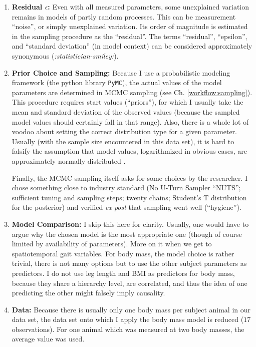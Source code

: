 \begin{enumerate}
\item \textbf{Residual \(\epsilon\):}
\label{sec:orgbf53734}
Even with all measured parameters, some unexplained variation remains in models of partly random processes.
This can be measurement ``noise'', or simply unexplained variation.
Its order of magnitude is estimated in the sampling procedure as the ``residual''.
The terms ``residual'', ``epsilon'', and ``standard deviation'' (in model context) can be considered approximately synonymous (\emph{:statistician-smiley:}).

\item \textbf{Prior Choice and Sampling:}
\label{sec:orgf31f4ce}
Because I use a probabilistic modeling framework (the python library \texttt{PyMC}), the actual values of the model parameters are determined in MCMC sampling (see Ch. \ref{workflow:sampling}).
This procedure requires start values (``priors''), for which I usually take the mean and standard deviation of the observed values (because the sampled model values should certainly fall in that range).
Also, there is a whole lot of voodoo about setting the correct distribution type for a given parameter.
Usually (with the sample size encountered in this data set), it is hard to falsify the assumption that model values, logarithmized in obvious cases, are approximately normally distributed \citep{Downey2013}.

Finally, the MCMC sampling itself asks for some choices by the researcher.
I chose something close to industry standard (No U-Turn Sampler ``NUTS''; sufficient tuning and sampling steps; twenty chains; Student's T distribution for the posterior) and verified \emph{ex post} that sampling went well (``hygiene'').

\item \textbf{Model Comparison:}
\label{sec:orgd46c837}
I skip this here for clarity.
Usually, one would have to argue why the chosen model is the most appropriate one (though of course limited by availability of parameters).
More on it when we get to spatiotemporal gait variables.
For body mass, the model choice is rather trivial, there is not many options but to use the other subject parameters as predictors.
I do not use leg length and BMI as predictors for body mass, because they share a hierarchy level, are correlated, and thus the idea of one predicting the other might falsely imply causality.

\item \textbf{Data:}
\label{sec:org71ae22a}
Because there is usually only one body mass per subject animal in our data set, the data set onto which I apply the body mass model is reduced (\(17\) observations).
For one animal which was measured at two body masses, the average value was used.


\end{enumerate}
